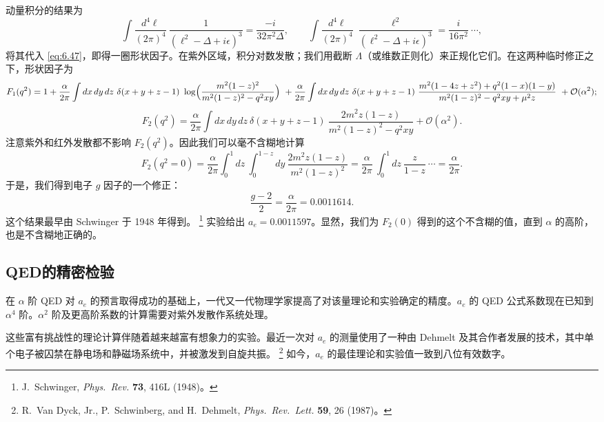 动量积分的结果为
\begin{equation}
  \int \frac{d^4\ell}{(2\pi)^4}\ \frac{1}{(\ell^2-\Delta+i\epsilon)^3}
    = \frac{-i}{32\pi^2\Delta},
  \qquad
  \int \frac{d^4\ell}{(2\pi)^4}\ \frac{\ell^2}{(\ell^2-\Delta+i\epsilon)^3}
    = \frac{i}{16\pi^2}\ \cdots ,
  \label{eq:6.48}
\end{equation}
将其代入 \eqref{eq:6.47}，即得一圈形状因子。在紫外区域，积分对数发散；我们用截断 $\Lambda$（或维数正则化）来正规化它们。在这两种临时修正之下，形状因子为
\begin{equation}
  F_1(q^2) = 1 + \frac{\alpha}{2\pi}\int dx\,dy\,dz\
    \delta(x+y+z-1)\ \log\Bigl(
      \frac{m^2(1-z)^2}{m^2(1-z)^2 - q^2xy} \Bigr)\
    + \frac{\alpha}{2\pi}\int dx\,dy\,dz\ \delta(x+y+z-1)\
      \frac{m^2(1-4z+z^2) + q^2(1-x)(1-y)}
        {m^2(1-z)^2 - q^2xy + \mu^2 z}\
    + \mathcal{O}(\alpha^2);
  \label{eq:6.56}
\end{equation}
\begin{equation}
  F_2(q^2) = \frac{\alpha}{2\pi}\int dx\,dy\,dz\
    \delta(x+y+z-1)\ \frac{2m^2z(1-z)}{m^2(1-z)^2 - q^2xy}
    + \mathcal{O}(\alpha^2) .
  \label{eq:6.57}
\end{equation}
注意紫外和红外发散都不影响 $F_2(q^2)$。因此我们可以毫不含糊地计算
\begin{equation}
  F_2(q^2 = 0) = \frac{\alpha}{2\pi}\int_0^1 dz\ \int_0^{1-z} dy\
    \frac{2m^2z(1-z)}{m^2(1-z)^2}
    = \frac{\alpha}{2\pi}\ \int_0^1 dz\ \frac{z}{1-z}\ \cdots
    = \frac{\alpha}{2\pi} .
  \label{eq:6.58}
\end{equation}
于是，我们得到电子 $g$ 因子的一个修正：
\begin{equation}
  \frac{g-2}{2} = \frac{\alpha}{2\pi} = 0.0011614 .
  \label{eq:6.59}
\end{equation}
这个结果最早由 Schwinger 于 1948 年得到。%
\footnote{J.~Schwinger, \emph{Phys.\ Rev.} \textbf{73}, 416L (1948)。}
实验给出 $a_e = 0.0011597$。显然，我们为 $F_2(0)$ 得到的这个不含糊的值，直到 $\alpha$ 的高阶，也是不含糊地正确的。

\subsection{QED的精密检验}

在 $\alpha$ 阶 QED 对 $a_e$ 的预言取得成功的基础上，一代又一代物理学家提高了对该量理论和实验确定的精度。$a_e$ 的 QED 公式系数现在已知到 $\alpha^4$ 阶。$\alpha^2$ 阶及更高阶系数的计算需要对紫外发散作系统处理。

这些富有挑战性的理论计算伴随着越来越富有想象力的实验。最近一次对 $a_e$ 的测量使用了一种由 Dehmelt 及其合作者发展的技术，其中单个电子被囚禁在静电场和静磁场系统中，并被激发到自旋共振。%
\footnote{R.~Van Dyck, Jr., P.~Schwinberg, and H.~Dehmelt, \emph{Phys.\ Rev.\
Lett.} \textbf{59}, 26 (1987)。} 如今，$a_e$ 的最佳理论和实验值一致到八位有效数字。

